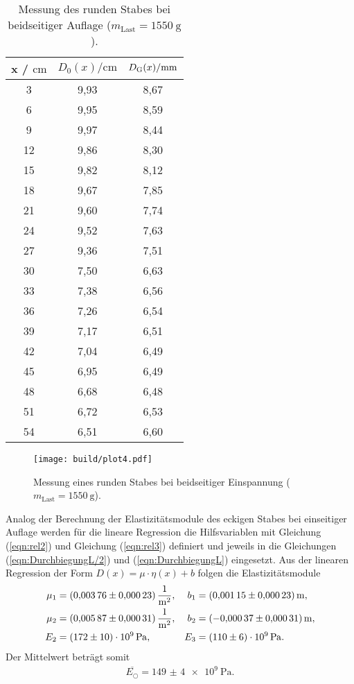 \sloppy
\begin{table}[H]
  \centering
  \caption{Messung des runden Stabes bei beidseitiger Auflage ($m_{\text{Last}} = \SI{1550}{\gram}$).}
  \label{tab:werte4}
  \begin{tabular}{c c c}
    \toprule
    x / $\si{\centi\meter} $ & $ D_0(x) / \si{\centi\meter}$ & $D_{\text G}(x) / \si{\milli\meter}$ \\
    \midrule
    3 & 9,93 & 8,67 \\
    6 & 9,95 & 8,59 \\
    9 & 9,97 & 8,44 \\
    12 & 9,86 & 8,30 \\
    15 & 9,82 & 8,12 \\
    18 & 9,67 & 7,85 \\
    21 & 9,60 & 7,74 \\
    24 & 9,52 & 7,63 \\
    27 & 9,36 & 7,51 \\
    30 & 7,50 & 6,63 \\
    33 & 7,38 & 6,56 \\
    36 & 7,26 & 6,54 \\
    39 & 7,17 & 6,51 \\
    42 & 7,04 & 6,49 \\
    45 & 6,95 & 6,49 \\
    48 & 6,68 & 6,48 \\
    51 & 6,72 & 6,53 \\
    54 & 6,51 & 6,60 \\
    \bottomrule
  \end{tabular}
\end{table}

\sloppy
\begin{figure}[H]
  \centering
  \texttt{[image: build/plot4.pdf]}
  \caption{Messung eines runden Stabes bei beidseitiger Einspannung ($m_{\text{Last}} = \SI{1550}{\gram}$).}
  \label{fig:plot4}
\end{figure}


Analog der Berechnung der Elastizitätsmodule des eckigen Stabes bei einseitiger Auflage werden für die lineare Regression die 
Hilfsvariablen mit Gleichung (\ref{eqn:rel2}) und Gleichung (\ref{eqn:rel3}) definiert und jeweils in die Gleichungen (\ref{eqn:DurchbiegungL/2})
und (\ref{eqn:DurchbiegungL}) eingesetzt. Aus der linearen Regression der Form 
$D(x) = \mu\cdot\eta(x)+b$ folgen die Elastizitätsmodule
\begin{align*}
  \mu_1 &= \SI{0.00376 (0.00023)}{\per\square\meter}, & b_1 &= \SI{0.00115(0.00023)}{\meter}, \\
  \mu_2 &= \SI{0.00587 (0.00031)}{\per\square\meter}, & b_2 &= \SI{-0.00037 (0.00031)}{\meter}, \\
  E_2 &= \SI{172 (10)e9}{\Pa}, & E_3 &= \SI{110 (6)e9}{\Pa}.\\
\end{align*}
Der Mittelwert beträgt somit
\begin{align*}
  \overline{E_{\bigcirc}} = \SI{149(4)e9}{\Pa}.
\end{align*}